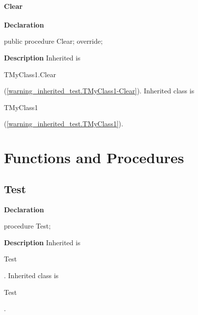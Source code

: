 \documentclass{report}
\begin{document}
\paragraph*{Clear}\hspace*{\fill}

\begin{list}{}{
\setlength{\itemindent}{0cm}
\setlength{\listparindent}{0cm}
\setlength{\leftmargin}{\evensidemargin}
\addtolength{\leftmargin}{\tmplength}
\settowidth{\labelsep}{X}
\addtolength{\leftmargin}{\labelsep}
\setlength{\labelwidth}{\tmplength}
}
\begin{flushleft}
\item[\textbf{Declaration}\hfill]
\begin{ttfamily}
public procedure Clear; override;\end{ttfamily}


\end{flushleft}
\par
\item[\textbf{Description}]
Inherited is \begin{ttfamily}TMyClass1.Clear\end{ttfamily}(\ref{warning_inherited_test.TMyClass1-Clear}). Inherited class is \begin{ttfamily}TMyClass1\end{ttfamily}(\ref{warning_inherited_test.TMyClass1}).

\end{list}
\section{Functions and Procedures}
\subsection*{Test}
\begin{list}{}{
\setlength{\itemindent}{0cm}
\setlength{\listparindent}{0cm}
\setlength{\leftmargin}{\evensidemargin}
\addtolength{\leftmargin}{\tmplength}
\settowidth{\labelsep}{X}
\addtolength{\leftmargin}{\labelsep}
\setlength{\labelwidth}{\tmplength}
}
\begin{flushleft}
\item[\textbf{Declaration}\hfill]
\begin{ttfamily}
procedure Test;\end{ttfamily}


\end{flushleft}
\par
\item[\textbf{Description}]
Inherited is \begin{ttfamily}Test\end{ttfamily}. Inherited class is \begin{ttfamily}Test\end{ttfamily}.

\end{list}
\end{document}
